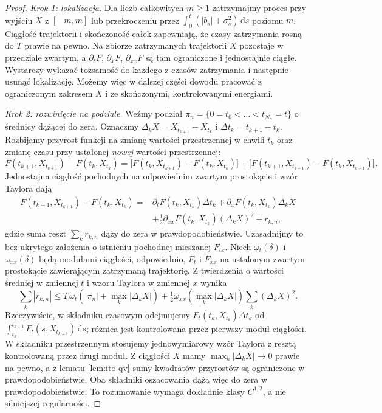 \documentclass[11pt,a4paper,oneside]{report}
\numberwithin{equation}{chapter}
\theoremstyle{plain}
\theoremstyle{definition}
\theoremstyle{remark}
\newcommand{\dd}{\mathrm{d}}
\begin{document}
\begin{proof}
\emph{Krok 1: lokalizacja.} Dla liczb całkowitych $m\ge1$
zatrzymajmy proces przy wyjściu $X$ z $[-m,m]$ lub
przekroczeniu przez $\int_0^t(|b_s|+\sigma_s^2)\,\dd s$
poziomu $m$. Ciągłość trajektorii i skończoność całek
zapewniają, że czasy zatrzymania rosną do $T$ prawie na pewno.
Na zbiorze zatrzymanych trajektorii $X$ pozostaje w
przedziale zwartym, a $\partial_tF$, $\partial_xF$,
$\partial_{xx}F$ są tam ograniczone i jednostajnie ciągłe.
Wystarczy wykazać tożsamość do każdego z czasów zatrzymania
i następnie usunąć lokalizację. Możemy więc w dalszej
części dowodu pracować z ograniczonym zakresem $X$
i ze skończonymi, kontrolowanymi energiami.

\emph{Krok 2: rozwinięcie na podziale.} Weźmy podział
$\pi_n=\{0=t_0<\dots<t_{N_n}=t\}$ o średnicy
dążącej do zera. Oznaczmy $\Delta_kX=X_{t_{k+1}}-X_{t_k}$
i $\Delta t_k=t_{k+1}-t_k$. Rozbijamy przyrost funkcji na zmianę wartości przestrzennej
w chwili $t_k$ oraz zmianę czasu przy 
ustalonej \emph{nowej} wartości przestrzennej:
\[
F(t_{k+1},X_{t_{k+1}})-F(t_k,X_{t_k})
=\bigl[F(t_k,X_{t_{k+1}})-F(t_k,X_{t_k})\bigr]
 +\bigl[F(t_{k+1},X_{t_{k+1}})-F(t_k,X_{t_{k+1}})\bigr].
\]
Jednostajna ciągłość pochodnych na odpowiednim zwartym
prostokącie i wzór Taylora dają
\[
\begin{split}
F(t_{k+1},X_{t_{k+1}})-F(t_k,X_{t_k})
={}&\partial_tF(t_k,X_{t_k})\Delta t_k
+\partial_xF(t_k,X_{t_k})\Delta_kX\\
&+\frac12\partial_{xx}F(t_k,X_{t_k})(\Delta_kX)^2+r_{k,n},
\end{split}
\]
gdzie suma reszt $\sum_k r_{k,n}$ dąży do zera
w prawdopodobieństwie. Uzasadnijmy to bez ukrytego
założenia o istnieniu pochodnej mieszanej $F_{tx}$.
Niech $\omega_t(\delta)$ i $\omega_{xx}(\delta)$
będą modułami ciągłości, odpowiednio, $F_t$ i $F_{xx}$
na ustalonym zwartym prostokącie zawierającym
zatrzymaną trajektorię. Z twierdzenia o wartości
średniej w zmiennej $t$ i wzoru Taylora w zmiennej $x$
wynika
\[
\sum_k|r_{k,n}|\le
T\,\omega_t\!\left(|\pi_n|+\max_k|\Delta_kX|\right)
+\tfrac12\omega_{xx}\!\left(\max_k|\Delta_kX|\right)
\sum_k(\Delta_kX)^2.
\]
Rzeczywiście, w składniku czasowym odejmujemy
$F_t(t_k,X_{t_k})\Delta t_k$ od
$\int_{t_k}^{t_{k+1}}F_t(s,X_{t_{k+1}})\,\dd s$;
różnica jest kontrolowana przez pierwszy moduł ciągłości.
W składniku przestrzennym stosujemy jednowymiarowy
wzór Taylora z resztą kontrolowaną przez drugi moduł.
Z ciągłości $X$ mamy $\max_k|\Delta_kX|\to0$
prawie na pewno, a z lematu \ref{lem:ito-qv} sumy
kwadratów przyrostów są ograniczone w prawdopodobieństwie.
Oba składniki oszacowania dążą więc do zera w
prawdopodobieństwie. To rozumowanie wymaga dokładnie
klasy $C^{1,2}$, a nie silniejszej regularności.


\end{proof}
\end{document}
